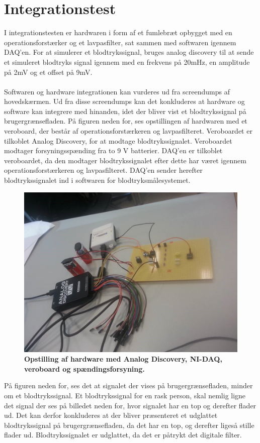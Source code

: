 \section{Integrationstest}
I integrationstesten er hardwaren i form af et fumlebræt opbygget med en operationsforstærker og et lavpasfilter, sat sammen med softwaren igennem DAQ’en. For at simulerer et blodtrykssignal, bruges analog discovery til at sende et simuleret blodtryks signal igennem med en frekvens på 20mHz, en amplitude på 2mV og et offset på 9mV. 
\\\\
Softwaren og hardware integrationen kan vurderes ud fra screendumps af hovedskærmen. Ud fra disse screendumps kan det konkluderes at hardware og software kan integrere med hinanden, idet der bliver vist et blodtrykssignal på brugergrænsefladen. På figuren neden for, ses opstillingen af hardwaren med et veroboard, der består af operationsforstærkeren og lavpasfilteret. Veroboardet er tilkoblet Analog Discovery, for at modtage blodtrykssignalet. Veroboardet modtager forsyningsspænding fra to 9 V batterier. DAQ’en er tilkoblet veroboardet, da den modtager blodtrykssignalet efter dette har været igennem operationsforstærkeren og lavpasfilteret. DAQ’en sender herefter blodtrykssignalet ind i softwaren for blodtryksmålesystemet.
\begin{figure}[H]
\includegraphics[width =1.0\textwidth , center]{billeder/opstilling_vero}
\caption{\textbf{Opstilling af hardware med Analog Discovery, NI-DAQ, veroboard og spændingsforsyning.}}
\end{figure}
På figuren neden for, ses det at signalet der vises på brugergrænsefladen, minder om et blodtrykssignal. Et blodtrykssignal for en rask person, skal nemlig ligne det signal der ses på billedet neden for, hvor signalet har en top og derefter flader ud. Det kan derfor konkluderes at der bliver præsenteret et udglattet blodtrykssignal på brugergrænsefladen, da det har en top, og derefter ligeså stille flader ud. Blodtrykssignalet er udglattet, da det er påtrykt det digitale filter. 
